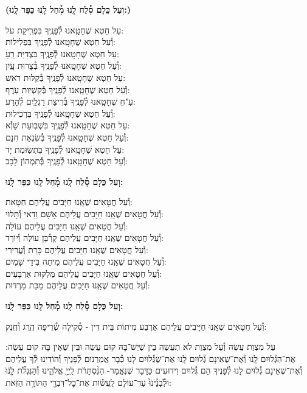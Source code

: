 \documentclass[twoside, openany, parskip=half, 11pt]{book}
\begin{document}
\textbf{(וְעַל כֻּלָם סְ֯לַח לָֽנוּ מְ֯חַל לָֽנוּ כַּפֵּר לָֽנוּ:)}

עַל חֵטְא שֶׁחָטָֽאנוּ לְ֯פָנֶֽיךָ בִּפְרִֽיקַת עֹל:\\ וְ֯עַל חֵטְא שֶׁחָטָֽאנוּ לְ֯פָנֶֽיךָ בִּפְלִילוֹת: \\
עַל חֵטְא שֶׁחָטָֽאנוּ לְ֯פָנֶֽיךָ בִּצְדִיַּת רֵֽעַ: \\ וְ֯עַל חֵטְא שֶׁחָטָֽאנוּ לְ֯פָנֶֽיךָ בְּ֯צָרוּת עָֽיִן: \\
עַל חֵטְא שֶׁחָטָֽאנוּ לְ֯פָנֶֽיךָ בְּ֯קַלּוּת רֹאשׁ:\\ וְ֯עַל חֵטְא שֶׁחָטָֽאנוּ לְ֯פָנֶֽיךָ בְּ֯קַשְׁיוּת עֹֽרֶף: \\
עַ"חֵ שֶׁחָטָֽאנוּ לְ֯פָנֶֽיךָ בְּ֯רִיצַת רַגְלַֽיִם לְ֯הָרַע:\\ וְ֯עַל חֵטְא שֶׁחָטָֽאנוּ לְ֯פָנֶֽיךָ בִּרְכִילוּת: \\
עַל חֵטְא שֶׁחָטָֽאנוּ לְ֯פָנֶֽיךָ בִּשְׁבֽוּעַת שָׁוְ֯א: \\ וְ֯עַל חֵטְא שֶׁחָטָֽאנוּ לְ֯פָנֶֽיךָ בְּ֯שִׂנְאַת חִנָם: \\
עַל חֵטְא שֶׁחָטָֽאנוּ לְ֯פָנֶֽיךָ בִּתְשֽׂוּמֶת יָד:\\ וְ֯עַל חֵטְא שֶׁחָטָֽאנוּ לְ֯פָנֶֽיךָ בְּ֯תִמְהוֹן לֵבָב:

\textbf{וְעַל כֻּלָם סְ֯לַח לָֽנוּ מְ֯חַל לָֽנוּ כַּפֵּר לָֽנוּ:}


וְ֯עַל חֲטָאִים שֶׁאָֽנוּ חַיָּבִים עֲלֵיהֶם חַטָּאת:\\
וְ֯עַל חֲטָאִים שֶׁאָֽנוּ חַיָּבִים עֲלֵיהֶם אָשָׁם וַדַאי וְ֯תָּלוּי:\\
וְ֯עַל חֲטָאִים שֶׁאָֽנוּ חַיָּבִים עֲלֵיהֶם עוֹלָה:\\
וְ֯עַל חֲטָאִים שֶׁאָֽנוּ חַיָּבִים עֲלֵיהֶם קָרְ֯בָּן עוֹלֶה וְ֯יוֹרֵד:\\
וְ֯עַל חֲטָאִים שֶׁאָֽנוּ חַיָּבִים עֲלֵיהֶם כָּרֵת וְ֯עֲרִירִי:\\
וְ֯עַל חֲטָאִים שֶׁאָֽנוּ חַיָּבִים עֲלֵיהֶם מִיתָה בִּידֵי שָׁמַיִם:\\
וְ֯עַל חֲטָאִים שֶׁאָֽנוּ חַיָּבִים עֲלֵיהֶם מַּלְקּוּת אַרְבָּעִים:\\
וְ֯עַל חֲטָאִים שֶׁאָֽנוּ חַיָּבִים עֲלֵיהֶם מַכַּת מַרְדוּת:



\textbf{וְעַל כֻּלָם סְ֯לַח לָֽנוּ מְ֯חַל לָֽנוּ כַּפֵּר לָֽנוּ:}

וְ֯עַל חֲטָאִים שֶׁאָֽנוּ חַיָּיבִים עֲלֵיהֶם אַרְבַּע מִיתוֹת בֵּית דִּין - סְ֯קִילָה שְׂ֯רֵיפָה הֶֽרֶג וְ֯חֶֽנֶק:

עַל מִצְוַת עֲשֵׂה וְ֯עַל מִצְוַת לֹא תַעֲשֶׂה בֵּין שֶׁיֵשׁ־בָּהּ קוּם עֲשֵׂה וּבֵין שֶׁאֵין בָּהּ קוּם עֲשֵׂה: אֶת־הַגְּ֯לוּיִם לָֽנוּ וְ֯אֶת־שֶׁאֵינָם גְּ֯לוּיִם לָֽנוּ אֶת־שֶׁגְּ֯לוּיִם לָנוּ כְּ֯בָר אֲמַרְנוּם לְ֯פָנֶיךָ וְ֯הוֹדִינוּ לְ֯ךָ עֲלֵיהֶם וְ֯אֶת־שֶׁאֵינָם גְּ֯לוּיִם לָנוּ לְ֯פָנֶיךָ הֵם גְּ֯לוּיִם וִידוּעִים כַּדָּבָר שֶׁנֶּאֱמַר- הַנִּ֨סְתָּרֹ֔ת
לַֽיְיָ֖ אֱלֹהֵ֑ינוּ וְ֯הַנִּגְלֹ֞ת לָֹ֤נֹוֹּ וֹּלְֹ֯בָֹנֵֹ֨יֹנֹוֹּ֙ עַד־עוֹלָ֔ם לַֽעֲשׂ֕וֹת אֶת־כׇּל־דִּבְרֵ֖י הַתּוֹרָ֥ה הַזֹּֽאת:
\end{document}

